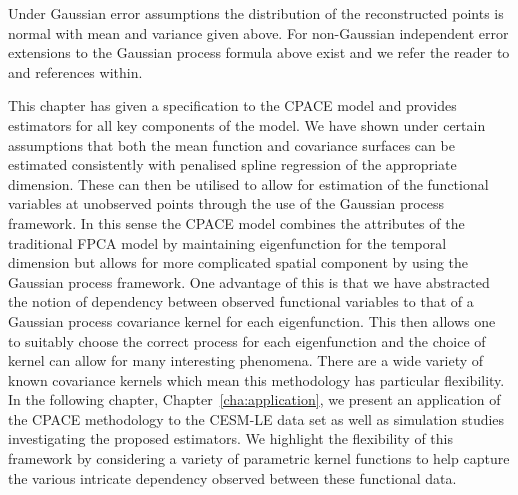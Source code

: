 Under Gaussian error assumptions the distribution of the reconstructed points is normal with mean and variance given above.
For non-Gaussian independent error extensions to the Gaussian process formula above exist and we refer the reader to \citep[Ch.~9]{williams_gaussian_2006} and references within.

This chapter has given a specification to the CPACE model and provides estimators for all key components of the model.
We have shown under certain assumptions that both the mean function and covariance surfaces can be estimated consistently with penalised spline regression of the appropriate dimension.
These can then be utilised to allow for estimation of the functional variables at unobserved points through the use of the Gaussian process framework.
In this sense the CPACE model combines the attributes of the traditional FPCA model by maintaining eigenfunction for the temporal dimension but allows for more complicated spatial component by using the Gaussian process framework. 
One advantage of this is that we have abstracted the notion of dependency between observed functional variables to that of a Gaussian process covariance kernel for each eigenfunction.
This then allows one to suitably choose the correct process for each eigenfunction and the choice of kernel can allow for many interesting phenomena.
There are a wide variety of known covariance kernels which mean this methodology has particular flexibility.
In the following chapter, Chapter~\ref{cha:application}, we present an application of the CPACE methodology to the CESM-LE data set as well as simulation studies investigating the proposed estimators.
We highlight the flexibility of this framework by considering a variety of parametric kernel functions to help capture the various intricate dependency observed between these functional data.